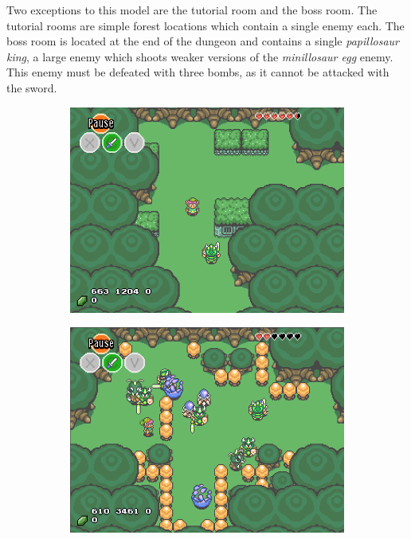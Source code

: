 \documentclass[a4paper]{article}
\begin{document}
\begin{multicols*}{2}
Two exceptions to this model are the tutorial room and the boss room. The tutorial rooms are simple forest locations which contain a single enemy each. The boss room is located at the end of the dungeon and contains a single \emph{papillosaur king}, a large enemy which shoots weaker versions of the \emph{minillosaur egg} enemy. This enemy must be defeated with three bombs, as it cannot be attacked with the sword.

\begin{figure}[t]
\centering
\begin{subfigure}[b]{0.45\textwidth}
  \includegraphics[width=\textwidth]{tutorialroom}
\end{subfigure} \hfill
\begin{subfigure}[b]{0.45\textwidth}
  \includegraphics[width=\textwidth]{forestroom}

\end{subfigure}
\end{figure}
\end{multicols*}
\end{document}
